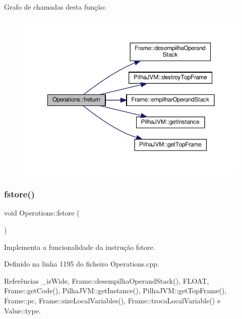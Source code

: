 Grafo de chamadas desta função\+:\nopagebreak
\begin{figure}[H]
\begin{center}
\leavevmode
\includegraphics[width=350pt]{classOperations_a701431fe6d5d20fafa747dbeae90e1d4_cgraph}
\end{center}
\end{figure}
\mbox{\label{classOperations_a42a0b3220b593059320cf7d5a5eed6e2}} 
\subsubsection{\texorpdfstring{fstore()}{fstore()}}
{\footnotesize\ttfamily void Operations\+::fstore (\begin{DoxyParamCaption}{ }\end{DoxyParamCaption})\hspace{0.3cm}{\ttfamily [private]}}



Implementa a funcionalidade da instrução fstore. 



Definido na linha 1195 do ficheiro Operations.\+cpp.



Referências \+\_\+is\+Wide, Frame\+::desempilha\+Operand\+Stack(), F\+L\+O\+AT, Frame\+::get\+Code(), Pilha\+J\+V\+M\+::get\+Instance(), Pilha\+J\+V\+M\+::get\+Top\+Frame(), Frame\+::pc, Frame\+::size\+Local\+Variables(), Frame\+::troca\+Local\+Variable() e Value\+::type.



